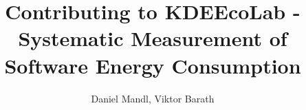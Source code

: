 \documentclass[12pt, a4paper]{report}
\begin{document}
\title{Contributing to KDEEcoLab - Systematic Measurement of Software Energy Consumption}
\author{Daniel Mandl, Viktor Barath}
\maketitle
\newpage

\tableofcontents

\newpage









\end{document}
